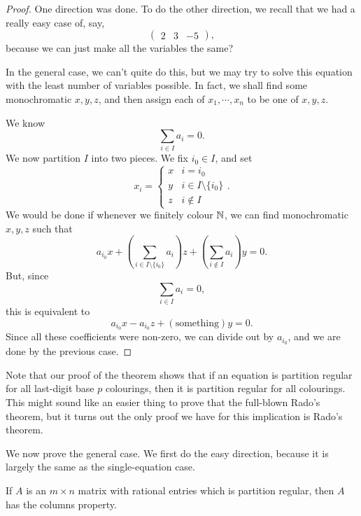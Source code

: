 \documentclass[a4paper]{article}
\begin{document}
  \begin{proof}
    One direction was done. To do the other direction, we recall that we had a really easy case of, say,
    \[
      \begin{pmatrix}
        2 & 3 & -5
      \end{pmatrix},
    \]
    because we can just make all the variables the same?

    In the general case, we can't quite do this, but we may try to solve this equation with the least number of variables possible. In fact, we shall find some monochromatic $x, y, z$, and then assign each of $x_1, \cdots, x_n$ to be one of $x, y, z$.

    We know
    \[
      \sum_{i \in I} a_i = 0.
    \]
    We now partition $I$ into two pieces. We fix $i_0 \in I$, and set
    \[
      x_i =
      \begin{cases}
        x & i = i_0\\
        y & i \in I \setminus \{i_0\}\\
        z & i \not\in I
      \end{cases}.
    \]
    We would be done if whenever we finitely colour $\mathbb{N}$, we can find monochromatic $x, y, z$ such that
    \[
      a_{i_0}x + \left(\sum_{i \in I \setminus \{i_0\}} a_i\right) z + \left(\sum_{i \not \in I} a_i\right) y = 0.
    \]
    But, since
    \[
      \sum_{i \in I} a_i = 0,
    \]
    this is equivalent to
    \[
      a_{i_0} x - a_{i_0} z + (\text{something}) y = 0.
    \]
    Since all these coefficients were non-zero, we can divide out by $a_{i_0}$, and we are done by the previous case.
  \end{proof}

  Note that our proof of the theorem shows that if an equation is partition regular for all last-digit base $p$ colourings, then it is partition regular for all colourings. This might sound like an easier thing to prove that the full-blown Rado's theorem, but it turns out the only proof we have for this implication is Rado's theorem.

  We now prove the general case. We first do the easy direction, because it is largely the same as the single-equation case.

  \begin{prop}
    If $A$ is an $m \times n$ matrix with rational entries which is partition regular, then $A$ has the columns property.
  \end{prop}
\end{document}
